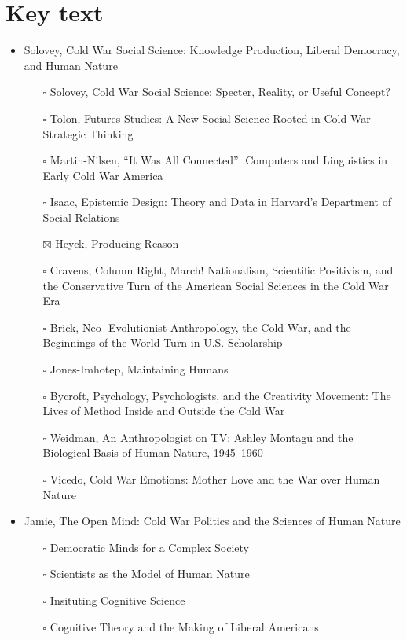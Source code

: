 \documentclass[paper=B6,portrait,twoside=true,twocolumn=false,headinclude=true,footinclude=false,fontsize=12,BCOR=10mm,DIV=calc,pagesize=auto,titlepage=firstiscover,mpinclude=false,headings=normal,headings=twolinechapter,open=right,toc=graduated,chapterprefix=false,numbers=endperiod,parskip=half+]{scrbook}
\theoremstyle{definition}
\begin{document}
\section{Key text}
\label{sec:org0f4a70d}
\begin{itemize}
\item\relax [1/11] Solovey, Cold War Social Science: Knowledge Production, Liberal
Democracy, and Human Nature
\begin{itemize}
\item[{$\square$}] Solovey, Cold War Social Science: Specter, Reality, or Useful Concept?
\item[{$\square$}] Tolon, Futures Studies: A New Social Science Rooted in Cold War Strategic Thinking
\item[{$\square$}] Martin-Nilsen, “It Was All Connected”: Computers and Linguistics in Early Cold War America
\item[{$\square$}] Isaac, Epistemic Design: Theory and Data in Harvard’s Department of Social Relations
\item[{$\boxtimes$}] Heyck, Producing Reason
\item[{$\square$}] Cravens, Column Right, March! Nationalism, Scientific Positivism, and the Conservative Turn of the American Social Sciences in the Cold War Era
\item[{$\square$}] Brick, Neo- Evolutionist Anthropology, the Cold War, and the Beginnings of the World Turn in U.S. Scholarship
\item[{$\square$}] Jones-Imhotep, Maintaining Humans
\item[{$\square$}] Bycroft, Psychology, Psychologists, and the Creativity Movement: The Lives of Method Inside and Outside the Cold War
\item[{$\square$}] Weidman, An Anthropologist on TV: Ashley Montagu and the Biological
Basis of Human Nature, 1945–1960
\item[{$\square$}] Vicedo, Cold War Emotions: Mother Love and the War over Human Nature
\end{itemize}
\item\relax [0/5] Jamie, The Open Mind: Cold War Politics and the Sciences of Human
Nature
\begin{itemize}
\item[{$\square$}] Democratic Minds for a Complex Society
\item[{$\square$}] Scientists as the Model of Human Nature
\item[{$\square$}] Insituting Cognitive Science
\item[{$\square$}] Cognitive Theory and the Making of Liberal Americans

\end{itemize}
\end{itemize}
\end{document}
